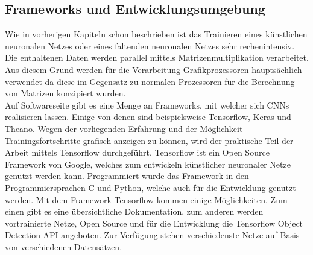 \documentclass[a4paper,12pt,oneside]{article}
\begin{document}
  \subsection{Frameworks und Entwicklungsumgebung}\label{s.entwicklung}
Wie in vorherigen Kapiteln schon beschrieben ist das Trainieren eines künstlichen neuronalen Netzes oder eines faltenden neuronalen Netzes sehr rechenintensiv. Die enthaltenen Daten werden parallel mittels Matrizenmultiplikation verarbeitet. Aus diesem Grund werden für die Verarbeitung Grafikprozessoren hauptsächlich verwendet da diese im Gegensatz zu normalen Prozessoren für die Berechnung von Matrizen konzipiert wurden.\\
Auf Softwareseite gibt es eine Menge an Frameworks, mit welcher sich CNNs realisieren lassen. Einige von denen sind beispielsweise Tensorflow, Keras und Theano. Wegen der vorliegenden Erfahrung und der Möglichkeit Trainingsfortschritte grafisch anzeigen zu können, wird der praktische Teil der Arbeit mittels Tensorflow durchgeführt. Tensorflow ist ein Open Source Framework von Google, welches zum entwickeln künstlicher neuronaler Netze genutzt werden kann. Programmiert wurde das Framework in den Programmiersprachen C und Python, welche auch für die Entwicklung genutzt werden. Mit dem Framework Tensorflow kommen einige Möglichkeiten. Zum einen gibt es eine übersichtliche Dokumentation, zum anderen werden vortrainierte Netze, Open Source und für die Entwicklung die Tensorflow Object Detection API angeboten. Zur Verfügung stehen verschiedenste Netze auf Basis von verschiedenen Datensätzen.
\end{document}
